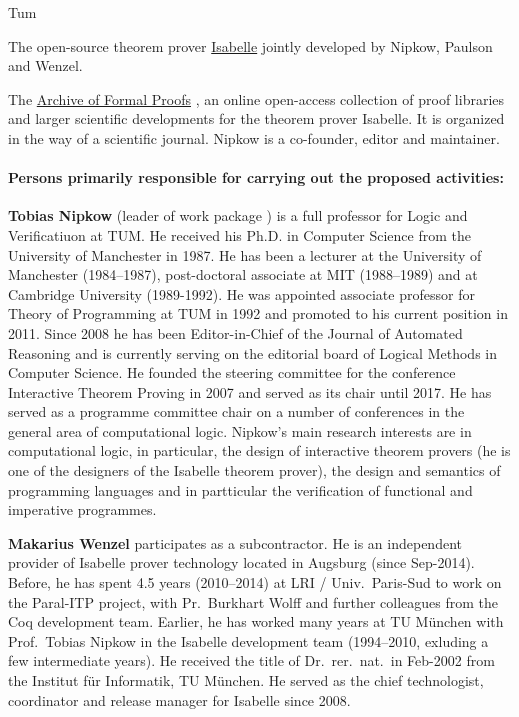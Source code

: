 \begin{sitedescription}{Tum}
\begin{compactitem}
\item The open-source theorem prover
  \href{https://isabelle.in.tum.de}{Isabelle} jointly developed by
  Nipkow, Paulson and Wenzel.
\item The \href{http://www.isa-afp.org}{Archive of Formal Proofs} \cite{isabelle-afp}, an online
open-access collection of proof libraries and larger scientific
developments for the theorem prover Isabelle. It is organized in the
way of a scientific journal.  Nipkow is a co-founder, editor and maintainer.
\end{compactitem}

\paragraph*{Persons primarily responsible for carrying out the proposed activities:}

\begin{compactitem}
\item \textbf{Tobias Nipkow} (leader of work package
) is a full professor for Logic and
Verificatiuon at TUM. He received his Ph.D. in Computer Science
from the University of Manchester in 1987.  He has been a
lecturer at the University of Manchester (1984--1987),
post-doctoral associate at MIT (1988--1989) and at Cambridge
University (1989-1992). He was appointed associate professor for Theory of Programming at
TUM in 1992 and promoted to his current position in 2011. Since 2008
he has been Editor-in-Chief of the  Journal of Automated Reasoning
and is currently serving on the editorial board of Logical Methods in
Computer Science. He founded the steering committee for the
conference Interactive Theorem Proving in 2007 and served as its
chair until 2017.
He has served as a programme committee chair
on a number of conferences in the general area of computational logic.  Nipkow's main research
interests are in computational logic, in particular, the design of
interactive theorem provers (he is one of the designers of the
Isabelle theorem prover), the design and semantics of programming
languages and in partticular the verification of functional and
imperative programmes.

\item \textbf{Makarius Wenzel} participates as a subcontractor. He is an independent provider of Isabelle
  prover technology located in Augsburg (since Sep-2014). Before, he
  has spent 4.5 years (2010--2014) at LRI / Univ.\ Paris-Sud to work on
  the Paral-ITP project, with Pr.~Burkhart Wolff and further
  colleagues from the Coq development team. Earlier, he has worked
  many years at TU München with Prof.\ Tobias Nipkow in the Isabelle
  development team (1994--2010, exluding a few intermediate years). He
  received the title of Dr.~rer.~nat.\ in Feb-2002 from the Institut
  für Informatik, TU München. He served as the chief technologist,
  coordinator and release manager for Isabelle since 2008.
\end{compactitem}

\end{sitedescription}

